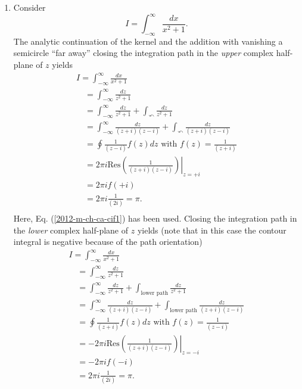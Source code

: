 {
\color{blue}
\bexample


\renewcommand{\labelenumi}{(\roman{enumi})}
\begin{enumerate}

\item  Consider   $$I=\int_{-\infty}^{\infty}\frac{dx}{x^2+1} .$$
The analytic continuation of the kernel and the addition with vanishing a semicircle ``far away'' closing the integration path
in the {\em upper} complex half-plane of $z$ yields
\begin{equation}
\begin{split}
I=\int_{-\infty}^{\infty}\frac{dx}{x^2+1} \\
\quad      =  \int_{-\infty}^{\infty}\frac{dz}{z^2+1}  \\
\quad      = \int_{-\infty}^{\infty}\frac{dz}{z^2+1} + \int_{\curvearrowleft} \frac{dz}{z^2+1} \\
\quad      = \int_{-\infty}^{\infty}\frac{dz}{(z+i)(z-i)} +  \int_{\curvearrowleft} \frac{dz}{(z+i)(z-i)} \\
\quad      = \oint\frac{1}{(z-i)} f(z) dz \textrm{ with } f(z)=\frac{1}{(z+i)} \\
\quad      = 2\pi i \textrm{Res}\left.\left(\frac{1}{(z+i)(z-i)} \right)\right|_{z=+i} \\
\quad      = 2\pi i f(+i)  \\
\quad      = 2\pi i \frac{1}{(2i)}     = \pi.   \\
\end{split}
\end{equation}
Here, Eq. (\ref{2012-m-ch-ca-cif1}) has been used.
Closing the integration path
in the {\em lower} complex half-plane of $z$ yields (note that in this case the contour integral is negative because of the path orientation)
\begin{equation}
\begin{split}
I=\int_{-\infty}^{\infty}\frac{dx}{x^2+1} \\
\quad      =  \int_{-\infty}^{\infty}\frac{dz}{z^2+1}  \\
\quad      = \int_{-\infty}^{\infty}\frac{dz}{z^2+1}  + \int_{\textrm{lower path}} \frac{dz}{z^2+1} \\
\quad      = \int_{-\infty}^{\infty}\frac{dz}{(z+i)(z-i)} + \int_{\textrm{lower path}} \frac{dz}{(z+i)(z-i)} \\
\quad      = \oint\frac{1}{(z+i)} f(z) dz \textrm{ with } f(z)=\frac{1}{(z-i)} \\
\quad      = -2\pi i \textrm{Res}\left.\left(\frac{1}{(z+i)(z-i)} \right)\right|_{z=-i} \\
\quad      = -2\pi i f(-i)  \\
\quad      = 2\pi i \frac{1}{(2i)}       = \pi.   \\
\end{split}
\end{equation}



\end{enumerate}}
